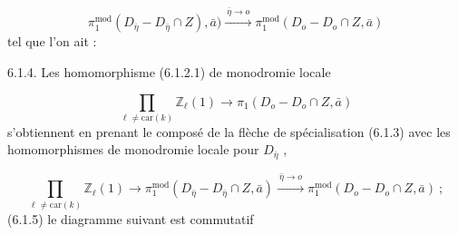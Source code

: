 \begin{equation}\tag{6.1.3}
\pi_1^{\mathrm{mod}}(D_{\bar{\eta}} - D_{\bar{\eta}} \cap Z), \bar{a}) \xrightarrow{\ \bar{\eta} \longrightarrow o\ } \pi_1^{\mathrm{mod}}(D_o - D_o \cap Z, \bar{a})
\end{equation}
tel que l'on ait :

6.1.4. Les homomorphisme (6.1.2.1) de monodromie locale

\begin{equation*}
\prod_{\ell \neq \mathrm{car}(k)} \mathbb{Z}_{\ell}(1) \longrightarrow \pi_1(D_o - D_o \cap Z, \bar{a})
\end{equation*}
s'obtiennent en prenant le composé de la flèche de spécialisation (6.1.3) avec les homomorphismes de monodromie locale pour $D_{\bar{\eta}}$ ,

\begin{equation}\tag{6.1.4.1}
\prod_{\ell \neq \mathrm{car}(k)} \mathbb{Z}_{\ell}(1) \longrightarrow \pi_1^{\mathrm{mod}}(D_{\bar{\eta}} - D_{\bar{\eta}} \cap Z, \bar{a}) \xrightarrow{\ \bar{\eta} \longrightarrow o\ } \pi_1^{\mathrm{mod}}(D_o - D_o \cap Z, \bar{a}) \ ;
\end{equation}
(6.1.5) le diagramme suivant est commutatif

